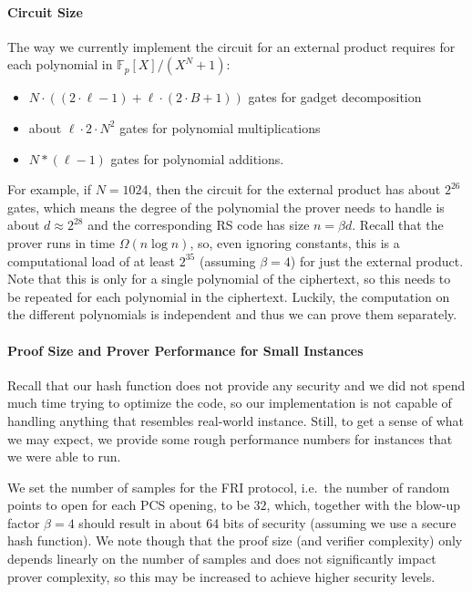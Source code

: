 \documentclass{zamarep}
\newcommand{\field}{\mathbb{F}}
\begin{document}
\paragraph{Circuit Size}
The way we currently implement the circuit for an external product requires for each polynomial in $\field_p[X]/(X^N + 1)$:
\begin{itemize}
\item $N \cdot ((2 \cdot \ell - 1) + \ell \cdot (2 \cdot B + 1))$ gates for gadget decomposition
\item about $\ell \cdot 2 \cdot N^2$ gates for polynomial multiplications
\item $N * (\ell - 1)$ gates for polynomial additions.
\end{itemize}
For example, if $N = 1024$, then the circuit for the external product has about $2^{26}$ gates, which means the degree of the polynomial the prover needs to handle is about $d \approx 2^{28}$ and the corresponding RS code has size $n = \beta d$. Recall that the prover runs in time $\Omega(n \log n)$, so, even ignoring constants, this is a computational load of at least $2^{35}$ (assuming $\beta = 4$) for just the external product. Note that this is only for a single polynomial of the ciphertext, so this needs to be repeated for each polynomial in the ciphertext. Luckily, the computation on the different polynomials is independent and thus we can prove them separately. 


\paragraph{Proof Size and Prover Performance for Small Instances}
Recall that our hash function does not provide any security and we did not spend much time trying to optimize the code, so our implementation is not capable of handling anything that resembles real-world instance. Still, to get a sense of what we may expect, we provide some rough performance numbers for instances that we were able to run.

We set the number of samples for the FRI protocol, i.e.\ the number of random points to open for each PCS opening, to be $32$, which, together with the blow-up factor $\beta=4$ should result in about 64 bits of security (assuming we use a secure hash function). We note though that the proof size (and verifier complexity) only depends linearly on the number of samples and does not significantly impact prover complexity, so this may be increased to achieve higher security levels.
\end{document}

